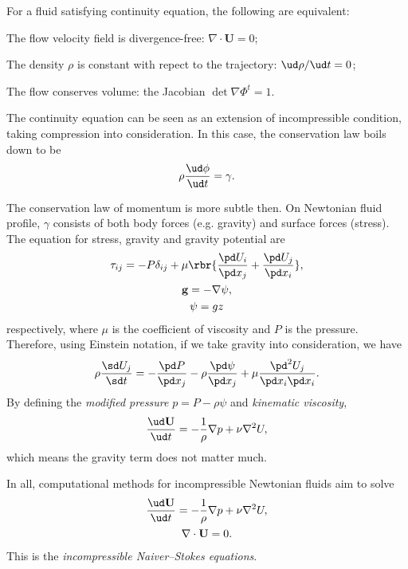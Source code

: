 \documentclass[english, nochinese]{pkupaper}
\begin{document}
\begin{thmtheorem}
For a fluid satisfying continuity equation, the following are equivalent:
\begin{partlist}
\item The flow velocity field is divergence-free: $ \nabla \cdot \mathbf{U} = 0 $;
\item The density $\rho$ is constant with repect to the trajectory: $ \ud \rho / \ud t = 0 $;
\item The flow conserves volume: the Jacobian $ \det \nabla \Phi^t = 1 $.
\end{partlist}
\end{thmtheorem}

The continuity equation can be seen as an extension of incompressible condition, taking compression into consideration. In this case, the conservation law boils down to be
\begin{equation}
\rho \frac{ \ud \phi }{ \ud t } = \gamma.
\end{equation}

The conservation law of momentum is more subtle then. On Newtonian fluid profile, $\gamma$ consists of both body forces (e.g. gravity) and surface forces (stress). The equation for stress, gravity and gravity potential are
\begin{gather}
\tau_{ i j } = - P \delta_{ i j } + \mu \rbr{ \frac{ \pd U_i }{ \pd x_j } + \frac{ \pd U_j }{ \pd x_i } }, \\
\mathbf{g} = -\nabla \psi, \\
\psi = g z 
\end{gather}
respectively, where $\mu$ is the coefficient of viscosity and $P$ is the pressure. Therefore, using Einstein notation, if we take gravity into consideration, we have
\begin{equation}
\rho \frac{ \sd U_j }{ \sd t } = - \frac{ \pd P }{ \pd x_j } - \rho \frac{ \pd \psi }{ \pd x_j } + \mu \frac{ \pd^2 U_j }{ \pd x_i \pd x_i }.
\end{equation}
By defining the \emph{modified pressure} $ p = P - \rho \psi $ and \emph{kinematic viscosity},
\begin{equation}
\frac{ \ud \mathbf{U} }{ \ud t } = -\frac{1}{\rho} \nabla p + \nu \nabla^2 U,
\end{equation}
which means the gravity term does not matter much.

In all, computational methods for incompressible Newtonian fluids aim to solve
\begin{equation} \label{Eq:INS}
\begin{gathered}
\frac{ \ud \mathbf{U} }{ \ud t } =  - \frac{1}{\rho} \nabla p + \nu \nabla^2 U, \\
\nabla \cdot \mathbf{U} = 0.
\end{gathered}
\end{equation}
This is the \emph{incompressible Naiver--Stokes equations}.
\end{document}
